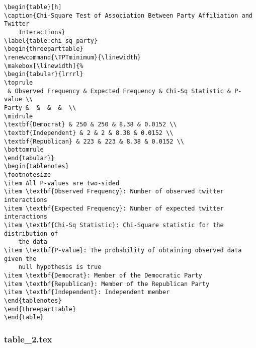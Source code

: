 \documentclass[11pt]{article}
\begin{document}
\begin{Verbatim}[tabsize=4]
\begin{table}[h]
\caption{Chi-Square Test of Association Between Party Affiliation and Twitter
	Interactions}
\label{table:chi_sq_party}
\begin{threeparttable}
\renewcommand{\TPTminimum}{\linewidth}
\makebox[\linewidth]{%
\begin{tabular}{lrrrl}
\toprule
 & Observed Frequency & Expected Frequency & Chi-Sq Statistic & P-value \\
Party &  &  &  &  \\
\midrule
\textbf{Democrat} & 250 & 250 & 8.38 & 0.0152 \\
\textbf{Independent} & 2 & 2 & 8.38 & 0.0152 \\
\textbf{Republican} & 223 & 223 & 8.38 & 0.0152 \\
\bottomrule
\end{tabular}}
\begin{tablenotes}
\footnotesize
\item All P-values are two-sided
\item \textbf{Observed Frequency}: Number of observed twitter interactions
\item \textbf{Expected Frequency}: Number of expected twitter interactions
\item \textbf{Chi-Sq Statistic}: Chi-Square statistic for the distribution of
	the data
\item \textbf{P-value}: The probability of obtaining observed data given the
	null hypothesis is true
\item \textbf{Democrat}: Member of the Democratic Party
\item \textbf{Republican}: Member of the Republican Party
\item \textbf{Independent}: Independent member
\end{tablenotes}
\end{threeparttable}
\end{table}

\end{Verbatim}

\subsubsection*{table\_2.tex}
\end{document}

